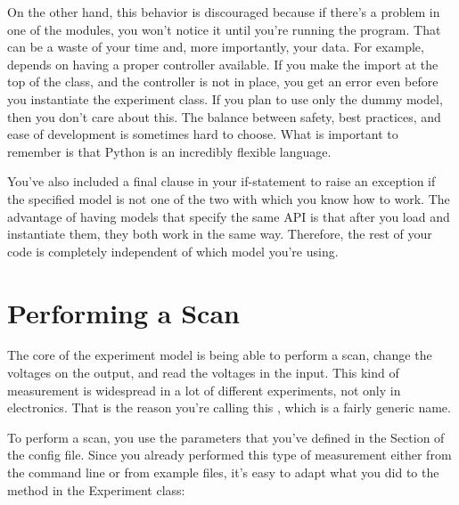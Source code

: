 On the other hand, this behavior is discouraged because if there's a problem in one of the modules, you won't notice it until you're running the program. That can be a waste of your time and, more importantly, your data. For example,  depends on having a proper controller available. If you make the import at the top of the class, and the controller is not in place, you get an error even before you instantiate the experiment class. If you plan to use only the dummy model, then you don't care about this. The balance between safety, best practices, and ease of development is sometimes hard to choose. What is important to remember is that Python is an incredibly flexible language.

You've also included a final clause in your if-statement to raise an exception if the specified model is not one of the two with which you know how to work. The advantage of having models that specify the same API is that after you load and instantiate them, they both work in the same way. Therefore, the rest of your code is completely independent of which model you're using.


\section{Performing a Scan}\label{sec:doing-scan}
The core of the experiment model is being able to perform a scan, change the voltages on the output, and read the voltages in the input. This kind of measurement is widespread in a lot of different experiments, not only in electronics. That is the reason you're calling this , which is a fairly generic name.


To perform a scan, you use the parameters that you've defined in the  Section of the config file. Since you already performed this type of measurement either from the command line or from example files, it's easy to adapt what you did to the method in the Experiment class:

